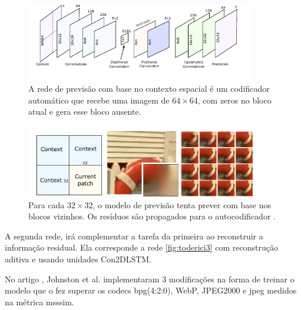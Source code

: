 \begin{figure}
	\centering
	\includegraphics[width=0.90\textwidth]{figuras/toderici_8.pdf}
	\caption[Modelo do autocodificador de previsão com base em contexto.]{A rede de previsão com base no contexto espacial é um codificador automático que recebe uma imagem de $64 \times 64$, com zeros no bloco atual e gera esse bloco ausente\cite{SpatiallyAdaptive2018Minnen}.}
	\label{fig:toderici8}
\end{figure}

\begin{figure}
	\centering
	\includegraphics[width=0.90\textwidth]{figuras/toderici_7.pdf}
	\caption[]{Para cada  $32 \times 32$, o modelo de previsão tenta prever com base nos blocos vizinhos. Os resíduos são propagados para o autocodificador \cite{SpatiallyAdaptive2018Minnen}.}
	\label{fig:toderici7}
\end{figure}

A segunda rede, irá complementar a tarefa da primeira ao reconstruir a informação residual. Ela corresponde a rede \ref{fig:toderici3} com reconstrução aditiva e usando unidades Con2DLSTM. 



No artigo \cite{Priming2017Johnston}, Johnston et al. implementaram 3 modificações na forma de treinar o modelo que o fez superar os \acrshort{codec}s \acrshort{bpg}(4:2:0), WebP, JPEG2000 e \acrshort{jpeg} medidos na métrica \acrshort{msssim}. 

